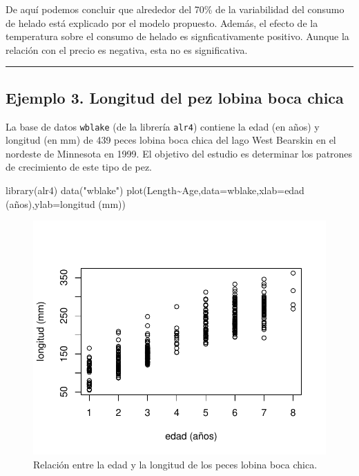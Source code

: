 \documentclass[
]{article}
\newenvironment{Shaded}{\begin{snugshade}}{\end{snugshade}}
\newcommand{\AttributeTok}[1]{\textcolor[rgb]{0.77,0.63,0.00}{#1}}
\newcommand{\FunctionTok}[1]{\textcolor[rgb]{0.00,0.00,0.00}{#1}}
\newcommand{\NormalTok}[1]{#1}
\newcommand{\SpecialCharTok}[1]{\textcolor[rgb]{0.00,0.00,0.00}{#1}}
\newcommand{\StringTok}[1]{\textcolor[rgb]{0.31,0.60,0.02}{#1}}
\begin{document}
De aquí podemos concluir que alrededor del 70\% de la variabilidad del consumo de helado está explicado por el modelo propuesto. Además, el efecto de la temperatura sobre el consumo de helado es signficativamente positivo. Aunque la relación con el precio es negativa, esta no es significativa.

\rule{\textwidth}{0.4pt}

\hypertarget{ejemplo-3.-longitud-del-pez-lobina-boca-chica}{%
\subsection*{Ejemplo 3. Longitud del pez lobina boca chica}\label{ejemplo-3.-longitud-del-pez-lobina-boca-chica}}

La base de datos \texttt{wblake} (de la librería \texttt{alr4}) contiene la edad (en años) y longitud (en mm) de 439 peces lobina boca chica del lago West Bearskin en el nordeste de Minnesota en 1999. El objetivo del estudio es determinar los patrones de crecimiento de este tipo de pez.

\begin{Shaded}
\begin{Highlighting}[]
\FunctionTok{library}\NormalTok{(alr4)}
\FunctionTok{data}\NormalTok{(}\StringTok{"wblake"}\NormalTok{)}
\FunctionTok{plot}\NormalTok{(Length}\SpecialCharTok{\textasciitilde{}}\NormalTok{Age,}\AttributeTok{data=}\NormalTok{wblake,}\AttributeTok{xlab=}\StringTok{\textquotesingle{}edad (años)\textquotesingle{}}\NormalTok{,}\AttributeTok{ylab=}\StringTok{\textquotesingle{}longitud (mm)\textquotesingle{}}\NormalTok{)}
\end{Highlighting}
\end{Shaded}

\begin{figure}

{\centering \includegraphics{MLGI_files/figure-latex/bassFig-1} 

}

\caption{\label{fig:bass} Relación entre la edad y la longitud de los peces lobina boca chica.}\label{fig:bassFig}
\end{figure}
\end{document}
